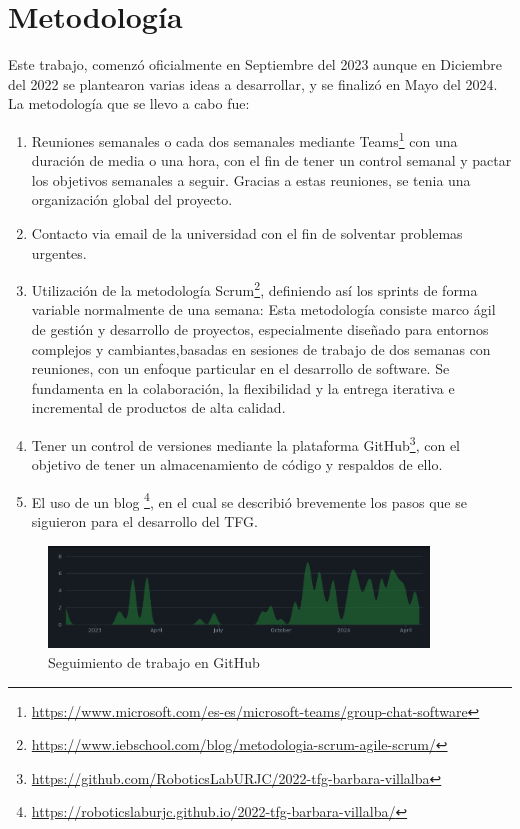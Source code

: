 \section{Metodología}
\label{sec:metodologia}

Este trabajo, comenzó oficialmente en Septiembre del 2023 aunque en Diciembre del 2022 se plantearon varias ideas a desarrollar, y se finalizó en Mayo del 2024. \\

La metodología que se llevo a cabo fue:

\begin{enumerate}
    \item Reuniones semanales o cada dos semanales mediante Teams\footnote{\url{https://www.microsoft.com/es-es/microsoft-teams/group-chat-software}} con una duración de media o una hora, con el fin de tener un control semanal y pactar los objetivos semanales a seguir. Gracias a estas reuniones, se tenia una organización global del proyecto. 
    \item Contacto via email de la universidad con el fin de solventar problemas urgentes. 
    \item Utilización de la metodología Scrum\footnote{\url{https://www.iebschool.com/blog/metodologia-scrum-agile-scrum/}}, definiendo así los sprints de forma variable 
    normalmente de una semana: Esta metodología consiste marco ágil de gestión y desarrollo de proyectos, especialmente diseñado para entornos complejos y cambiantes,basadas en sesiones de trabajo de dos semanas con reuniones,
    con un enfoque particular en el desarrollo de software. Se fundamenta en la colaboración, la flexibilidad y la entrega iterativa e incremental de productos de alta calidad.
    \item Tener un control de versiones mediante la plataforma GitHub\footnote{\url{https://github.com/RoboticsLabURJC/2022-tfg-barbara-villalba}}, con el objetivo de tener un almacenamiento de código y respaldos de ello.  
    \item El uso de un blog \footnote{\url{https://roboticslaburjc.github.io/2022-tfg-barbara-villalba/}}, en el cual se describió brevemente los pasos que se siguieron para el desarrollo del TFG.
\end{enumerate}

\begin{figure} [H]
    \begin{center}
      \includegraphics[width=0.9\textwidth,height=0.3\textwidth]{figs/objetivos/github.png}
    \end{center}
    \caption{Seguimiento de trabajo en GitHub}
    \label{fig:github}
  \end{figure}



